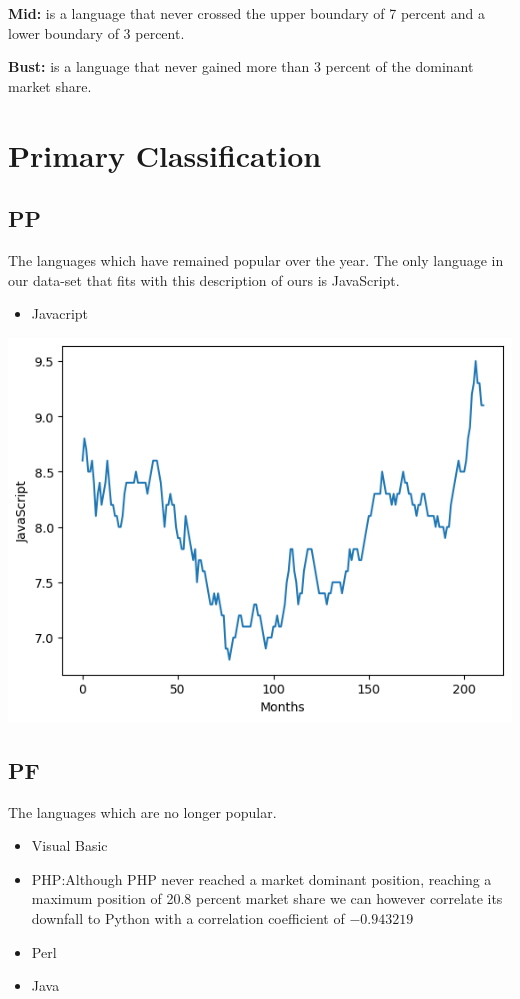 \documentclass[conference]{IEEEtran}
\begin{document}
\textbf{Mid:} is a language that never crossed the upper boundary of 7 percent and a lower boundary of 3 percent.

\textbf{Bust:} is a language that never gained more than 3 percent of the dominant market share.

\section{Primary Classification}

\subsection{PP}
The languages which have remained popular over the year. The only language in our data-set that fits with this description of ours is JavaScript.
\begin{itemize}
\item{Javacript}
\end{itemize}

\noindent
\includegraphics[scale=0.4]{lineplot/javascript.png}


\subsection{PF}
The languages which are no longer popular.

\begin{itemize}
\item{Visual Basic}
\item{PHP}:Although PHP never reached a market dominant position, reaching a maximum position of 20.8 percent market share we can however correlate its downfall to Python with a correlation coefficient of \(-0.943219\)
\item{Perl}
\item{Java}
\end{itemize}
\end{document}
